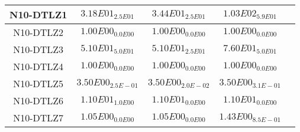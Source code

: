\documentclass{article}
\begin{document}
\begin{table*}[ht!]
\begin{tabular}{|c||c||c||c||c|}
\hline
N10-DTLZ1 &\cellcolor{gray95}$3.18E01_{2.5E01}$ &\cellcolor{gray25}$3.44E01_{2.5E01}$ &$1.03E02_{5.9E01}$\\ 
\hline
N10-DTLZ2 &\cellcolor{gray95}$1.00E00_{0.0E00}$ &\cellcolor{gray25}$1.00E00_{0.0E00}$ &$1.00E00_{0.0E00}$\\ 
\hline
N10-DTLZ3 &\cellcolor{gray25}$5.10E01_{5.0E01}$ &\cellcolor{gray95}$5.10E01_{2.5E01}$ &$7.60E01_{5.0E01}$\\ 
\hline
N10-DTLZ4 &\cellcolor{gray95}$1.00E00_{0.0E00}$ &\cellcolor{gray25}$1.00E00_{0.0E00}$ &$1.00E00_{0.0E00}$\\ 
\hline
N10-DTLZ5 &\cellcolor{gray25}$3.50E00_{2.5E-01}$ &\cellcolor{gray95}$3.50E00_{2.0E-02}$ &$3.50E00_{3.1E-01}$\\ 
\hline
N10-DTLZ6 &$1.10E01_{1.0E00}$ &\cellcolor{gray95}$1.10E01_{0.0E00}$ &\cellcolor{gray25}$1.10E01_{0.0E00}$\\ 
\hline
N10-DTLZ7 &\cellcolor{gray95}$1.05E00_{0.0E00}$ &\cellcolor{gray25}$1.05E00_{0.0E00}$ &$1.43E00_{8.5E-01}$\\ 
\hline
\end{tabular}
\end{table*}
\end{document}
